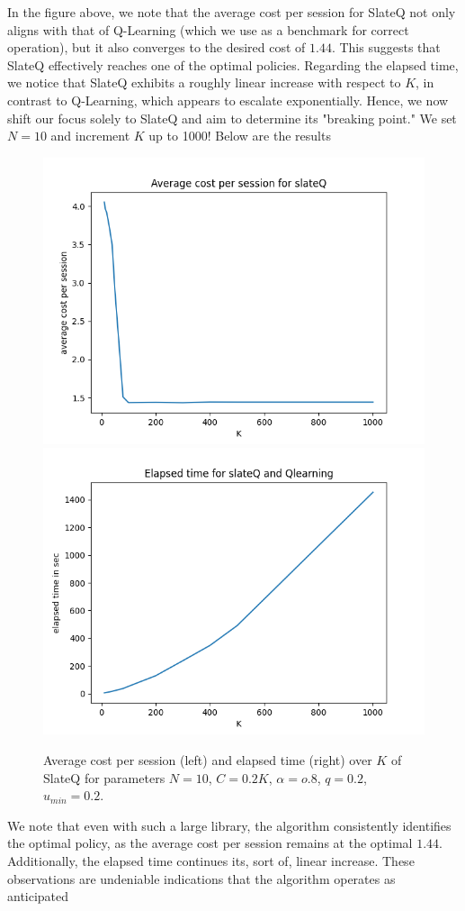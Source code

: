 \documentclass[12pt]{article}
\begin{document}
In the figure above, we note that the average cost per session for SlateQ not only aligns with that of Q-Learning (which we use as a benchmark for correct operation), but it also converges to the desired cost of $1.44$. 
This suggests that SlateQ effectively reaches one of the optimal policies. Regarding the elapsed time, we notice that SlateQ exhibits a roughly 
linear increase with respect to $K$, in contrast to Q-Learning, which appears to escalate exponentially. Hence, we now shift our focus solely to SlateQ and aim to determine its "breaking point."
 We set $N=10$ and increment $K$ up to 1000! Below are the results
 \begin{figure}[H] %
    \centering
    \includegraphics[width=0.49\linewidth]{Figure_3.png}
    \includegraphics[width=0.49\linewidth]{Figure_4.png}
    \caption{Average cost per session (left) and elapsed time (right) over $K$ of SlateQ for parameters $N=10$, $C=0.2K$, $\alpha = o.8$, $q= 0.2$, $u_{min} = 0.2$.}
\end{figure}
We note that even with such a large library, the algorithm consistently identifies the optimal policy, as the average cost per session remains at the optimal $1.44$. 
Additionally, the elapsed time continues its, sort of, linear increase. 
These observations are undeniable indications that the algorithm operates as anticipated
\end{document}
